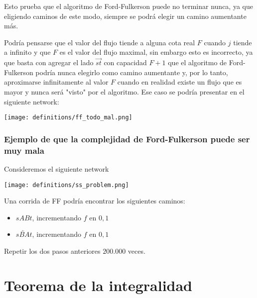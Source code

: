 \documentclass[10pt,a4paper]{article}
\begin{document}
Esto prueba que el algoritmo de Ford-Fulkerson puede no terminar nunca, ya que eligiendo caminos de este modo, siempre se podrá elegir un camino aumentante más.

Podría pensarse que el valor del flujo tiende a alguna cota real $F$ cuando $j$ tiende a infinito y que $F$ es el valor del flujo maximal, sin embargo esto es incorrecto, ya que basta con agregar el lado $\overrightarrow{st}$ con capacidad $F + 1$ que el algoritmo de Ford-Fulkerson podría nunca elegirlo como camino aumentante y, por lo tanto, aproximarse infinitamente al valor $F$ cuando en realidad existe un flujo que es mayor y nunca será "visto" por el algoritmo. Ese caso se podría presentar en el siguiente network:

\begin{center}

    \begin{adjustbox}{max size={\textwidth}{\textheight}}
        \texttt{[image: definitions/ff\_todo\_mal.png]}
        \end{adjustbox}
    
\end{center}

\subsubsection*{Ejemplo de que la complejidad de Ford-Fulkerson puede ser muy mala}

Consideremos el siguiente network

\begin{center}

    \begin{adjustbox}{max size={\textwidth}{\textheight}}
        \texttt{[image: definitions/ss\_problem.png]}
        \end{adjustbox}
    
\end{center}

Una corrida de FF podría encontrar los siguientes caminos:

\begin{itemize}

	\item $sABt$, incrementando $f$ en $0,1$
	\item $s\overleftarrow{BA}t$, incrementando $f$ en $0,1$
\end{itemize}

Repetir los dos pasos anteriores $200.000$ veces.

\section*{Teorema de la integralidad}
\end{document}
